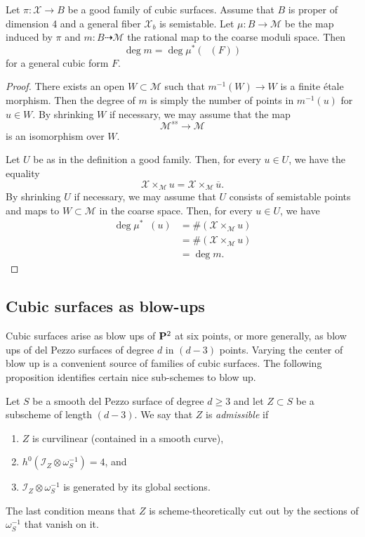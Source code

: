 \documentclass[11pt,reqno, letterpaper]{amsart}
\DeclareMathOperator{\Orb}{\overline{Orb}}
\renewcommand{\to}{{\longrightarrow}}
\numberwithin{equation}{section}
\newcommand{\cX}{\mathcal{X}}
\begin{document}
\begin{proposition}\label{prop:goodisgood}
  Let $\pi \colon \cX \to B$ be a good family of cubic surfaces.
  Assume that $B$ is proper of dimension 4 and a general fiber $\cX_b$ is semistable.
  Let $\mu \colon B \to \mathscr M$ be the map induced by $\pi$ and $m \colon B \dashrightarrow \mathcal M$ the rational map to the coarse moduli space.
  Then
  \[ \deg m = \deg \mu^*\left( \Orb(F) \right)\]
  for a general cubic form $F$.
\end{proposition}
\begin{proof}
  There exists an open $W \subset \mathcal M$ such that $m^{-1} (W) \to W$ is a finite \'etale morphism.
  Then the degree of $m$ is simply the number of points in $m^{-1}(u)$ for $u \in W$.
  By shrinking $W$ if necessary, we may assume that the map
  \[ \mathscr M^{ss} \to \mathcal M\]
  is an isomorphism over $W$.

  Let $U$ be as in the definition a good family.
  Then, for every $u \in U$, we have the equality
  \[ \cX \times_{\mathscr M} u = \cX \times_{\mathscr M} \overline u.\]
  By shrinking $U$ if necessary, we may assume that $U$ consists of semistable points and maps to $W \subset \mathcal M$ in the coarse space.
  Then, for every $u \in U$, we have
  \begin{align*}
    \deg \mu^* \Orb(u) &= \# \left(\cX \times_{\mathscr M} u \right)\\
                       &= \# \left(\cX \times_{\mathcal M} u\right) \\
                       &= \deg m.
  \end{align*}
\end{proof}

\subsection{Cubic surfaces as blow-ups}
Cubic surfaces arise as blow ups of $\P^2$ at six points, or more generally, as blow ups of del Pezzo surfaces of degree $d$ in $(d-3)$ points.
Varying the center of blow up is a convenient source of families of cubic surfaces.
The following proposition identifies certain nice sub-schemes to blow up.

\begin{definition}
  \label{def:admissible}
  Let $S$ be a smooth del Pezzo surface of degree $d \geq 3$ and let $Z \subset S$ be a subscheme of length $(d-3)$.
  We say that $Z$ is \emph{admissible} if 
  \begin{enumerate}
  \item $Z$ is curvilinear (contained in a smooth curve),
  \item $h^{0}\left(\mathcal{I}_Z \otimes \omega_S^{-1}\right) = 4$, and
  \item $\mathcal I_Z \otimes \omega_S^{-1}$ is generated by its global sections.
  \end{enumerate}
\end{definition}
The last condition means that $Z$ is scheme-theoretically cut out by the sections of $\omega_S^{-1}$ that vanish on it.
\end{document}
